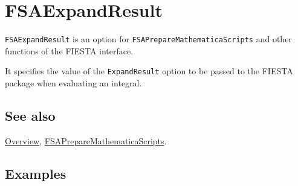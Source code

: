 \documentclass[../FeynHelpersManual.tex]{subfiles}
\begin{document}
\begin{Shaded}
\begin{Highlighting}[]
 
\end{Highlighting}
\end{Shaded}

\hypertarget{fsaexpandresult}{
\section{FSAExpandResult}\label{fsaexpandresult}}

\texttt{FSAExpandResult} is an option for
\texttt{FSAPrepareMathematicaScripts} and other functions of the FIESTA
interface.

It specifies the value of the \texttt{ExpandResult} option to be passed
to the FIESTA package when evaluating an integral.

\subsection{See also}

\hyperlink{toc}{Overview},
\hyperlink{fsapreparemathematicascripts}{FSAPrepareMathematicaScripts}.

\subsection{Examples}
\end{document}
